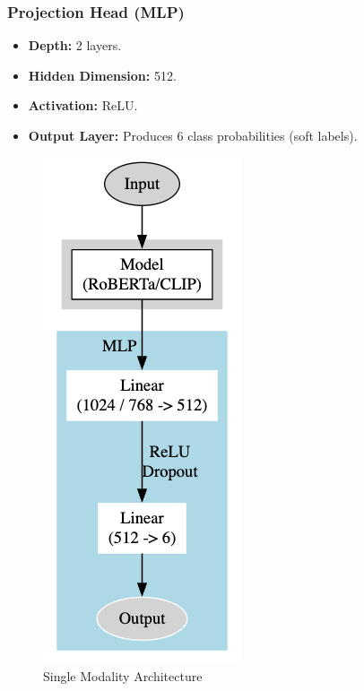 \subsubsection*{Projection Head (MLP)}
\begin{itemize}
    \item \textbf{Depth:} 2 layers.
    \item \textbf{Hidden Dimension:} 512.
    \item \textbf{Activation:} ReLU.
    \item \textbf{Output Layer:} Produces $6$ class probabilities (soft labels).
\end{itemize}


\begin{figure}[ht]
    \centering
    \begin{minipage}{0.49\textwidth}
        \centering
        \includegraphics[height=0.5\textheight]{images/unimodal.png}
        \caption{Single Modality Architecture}
        \label{fig:arch1}
    \end{minipage}
    \hfill
    \begin{minipage}{0.49\textwidth}
        \centering

\end{minipage}
\end{figure}

